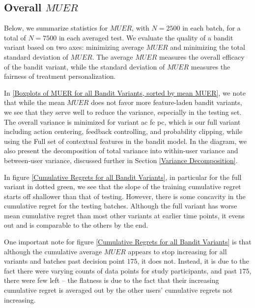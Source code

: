 \subsection{Overall $MUER$}

Below, we summarize statistics for $MUER$, with $N = 2500$ in each batch, for a total of $N = 7500$ in each averaged test.  We evaluate the quality of a bandit variant based on two axes: minimizing average $MUER$ and minimizing the total standard deviation of $MUER$.  The average $MUER$ measures the overall efficacy of the bandit variant, while the standard deviation of $MUER$ measures the fairness of treatment personalization.

In \ref{Boxplots of MUER for all Bandit Variants, sorted by mean MUER}, we note that while the mean $MUER$ does not favor more feature-laden bandit variants, we see that they serve well to reduce the variance, especially in the testing set.  The overall variance is minimized for variant ac fc pc, which is our full variant including action centering, feedback controlling, and probability clipping, while using the Full set of contextual features in the bandit model.  In the diagram, we also present the decomposition of total variance into within-user variance and between-user variance, discussed further in Section \ref{Variance Decomposition}.


In figure \ref{Cumulative Regrets for all Bandit Variants}, in particular for the full variant in dotted green, we see that the slope of the training cumulative regret starts off shallower than that of testing.  However, there is some concavity in the cumulative regret for the testing batches. Although the full variant has worse mean cumulative regret than most other variants at earlier time points, it evens out and is comparable to the others by the end.

One important note for figure \ref{Cumulative Regrets for all Bandit Variants} is that although the cumulative average $MUER$ appears to stop increasing for all variants and batches past decision point $175$, it does not.  Instead, it is due to the fact there were varying counts of data points for study participants, and past $175$, there were few left -- the flatness is due to the fact that their increasing cumulative regret is averaged out by the other users' cumulative regrets not increasing.

